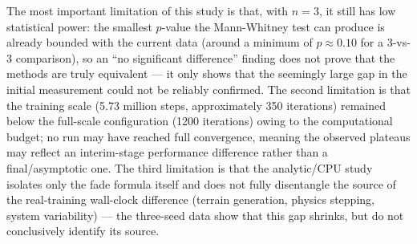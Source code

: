The most important limitation of this study is that, with $n=3$, it
still has low statistical power: the smallest $p$-value the Mann-Whitney
test can produce is already bounded with the current data (around a
minimum of $p\approx 0.10$ for a 3-vs-3 comparison), so an ``no
significant difference'' finding does not prove that the methods are
truly equivalent --- it only shows that the seemingly large gap in the
initial measurement could not be reliably confirmed. The second
limitation is that the training scale (5.73 million steps, approximately
350 iterations) remained below the full-scale configuration (1200
iterations) owing to the computational budget; no run may have reached
full convergence, meaning the observed plateaus may reflect an
interim-stage performance difference rather than a final/asymptotic one.
The third limitation is that the analytic/CPU study isolates only the
fade formula itself and does not fully disentangle the source of the
real-training wall-clock difference (terrain generation, physics
stepping, system variability) --- the three-seed data show that this gap
shrinks, but do not conclusively identify its source.
